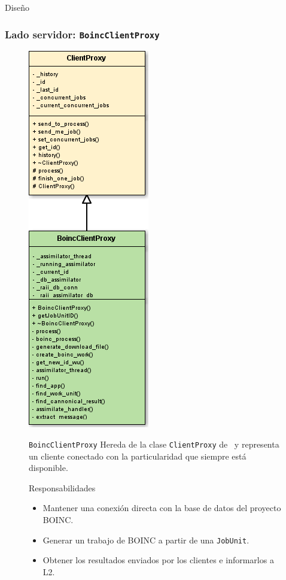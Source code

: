 \begin{subsection}{Diseño}
	\begin{frame}\frametitle{Lado servidor: \texttt{BoincClientProxy}}
  		\begin{figure}[h] 		
    		\begin{minipage}{2.7cm}
      			\includegraphics[scale=0.3]{images/BoincClientProxy.png}
    		\end{minipage}
    		\begin{minipage}{0.7 \textwidth}
      			\begin{block}{\texttt{BoincClientProxy}}
      				Hereda de la clase \texttt{ClientProxy} de \fud \ y representa un cliente conectado con la 
      				particularidad que siempre está disponible.
      			\end{block}
				\vspace{3mm}
      			\begin{block}{Responsabilidades}
      				\begin{itemize}
						\item Mantener una conexión directa con la base de datos del proyecto BOINC.
						\item Generar un trabajo de BOINC a partir de una \texttt{JobUnit}.
						\item Obtener los resultados enviados por los clientes e informarlos a L2.
					\end{itemize}
      			\end{block}	
      		\end{minipage}
    	\end{figure}
	\end{frame}


\end{subsection}
